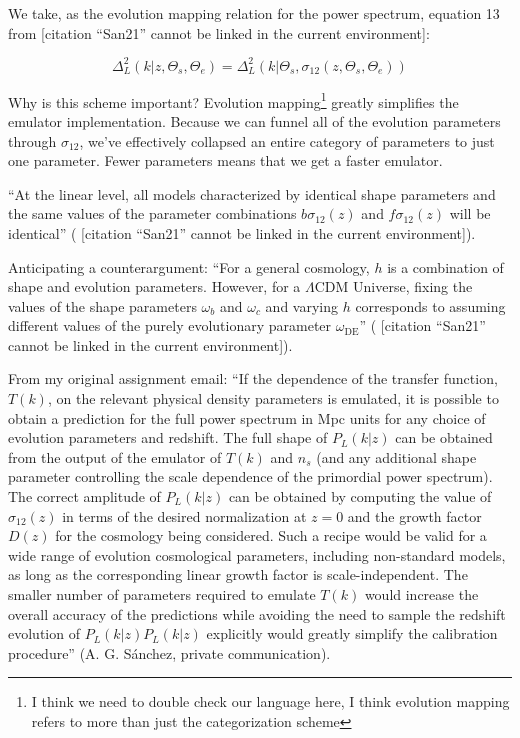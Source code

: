 \documentclass[11pt]{article}
\newcommand{\cbib}[1]
{\IfFileExists{biblatex.sty}
{\cite{#1}}
{[citation ``#1'' cannot be linked in the current environment]}}
\begin{document}
We take, as the evolution mapping relation for the power spectrum, equation 13
from \cbib{San21}:

\begin{equation}
\label{eq: evMapping_pSpectrum}
    \Delta^2_L (k | z, \Theta_s, \Theta_e)
    =
    \Delta_L^2 (k | \Theta_s, \sigma_{12} \left( z, \Theta_s, \Theta_e \right))
\end{equation}

Why is this scheme important? Evolution mapping\footnote{I think we need to
double check our language here, I think evolution mapping refers to more than
just the categorization scheme} greatly simplifies the emulator
implementation. Because we can
funnel all of the evolution parameters through $\sigma_{12}$, we've effectively
collapsed an entire category of parameters to just one parameter. Fewer
parameters means that we get a faster emulator.

``At the linear level, all models characterized by identical shape parameters
and the same values of the parameter combinations $b \sigma_{12}(z)$ and
$f \sigma_{12}(z)$ will be identical'' (\cbib{San21}).

Anticipating a counterargument: ``For a general cosmology, $h$ is a combination
of shape and evolution parameters. However, for a $\Lambda$CDM Universe, fixing
the values of the shape parameters $\omega_b$ and $\omega_c$ and varying $h$
corresponds to assuming different values of the purely evolutionary parameter
$\omega_\text{DE}$'' (\cbib{San21}).

From my original assignment email:
``If the dependence of the transfer function, $T(k)$, on the relevant physical
density parameters is emulated, it is possible to obtain a prediction for the
full power spectrum in Mpc units for any choice of evolution parameters and
redshift. The full shape of $P_L(k|z)$ can be obtained from the output of the
emulator of $T(k)$ and $n_s$ (and any additional shape parameter controlling
the scale dependence of the primordial power spectrum). The correct amplitude
of $P_L(k|z)$ can be obtained by computing the value of $\sigma_{12}(z)$ in
terms of the desired normalization at $z=0$ and the growth factor $D(z)$ for
the cosmology being considered. Such a recipe would be valid for a wide range
of evolution cosmological parameters, including non-standard models, as long as
the corresponding linear growth factor is scale-independent. The smaller number
of parameters required to emulate $T(k)$ would increase the overall accuracy of
the predictions while avoiding the need to sample the redshift evolution of
$P_L(k|z) P_L(k|z)$ explicitly would greatly simplify the calibration
procedure'' (A. G. S\'{a}nchez, private communication).
\end{document}

